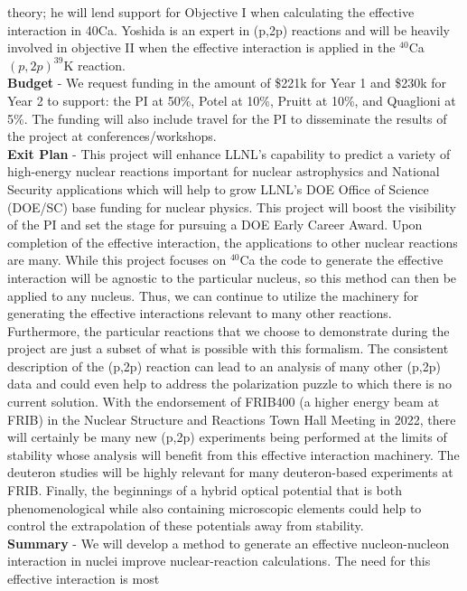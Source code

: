 \documentclass[12pt]{article}
\begin{document}
theory; he will lend support for Objective I when calculating the effective interaction in 40Ca. Yoshida is an expert in (p,2p) reactions and will be heavily involved in objective
II when the effective interaction is applied in the $^{40}$Ca$(p,2p)^{39}$K reaction.
\\
\textbf{Budget}
 - We request funding in the amount of \$221k for Year 1 and \$230k for Year 2 to support: the PI at 50\%, Potel at 10\%, Pruitt at 10\%, and Quaglioni at 5\%. The funding will
 also include travel for the PI to disseminate the results of the project at conferences/workshops.
\\
\textbf{Exit Plan}
 - This project will enhance LLNL's capability to predict a variety of high-energy nuclear reactions important for nuclear astrophysics and National Security applications which will
help to grow LLNL's DOE Office of Science (DOE/SC) base funding for nuclear physics. This project will boost the visibility of the PI and set the stage for pursuing a DOE Early
Career Award. Upon completion of the effective interaction, the applications to other nuclear reactions are many. While this project focuses on $^{40}$Ca the code to generate the
effective interaction will be agnostic to the particular nucleus, so this method can then be applied to any nucleus. Thus, we can continue to utilize the machinery for generating
the effective interactions relevant to many other reactions. Furthermore, the particular reactions that we choose to demonstrate during the project are just a subset of what is
possible with this formalism. The consistent description of the (p,2p) reaction can lead to an analysis of many other (p,2p) data and could even help to address the polarization
puzzle to which there is no current solution.  With the endorsement of FRIB400 (a higher energy beam at FRIB) in the Nuclear Structure and Reactions Town Hall Meeting in 2022,
there will certainly be many new (p,2p) experiments being performed at the limits of stability whose analysis will benefit from this effective interaction machinery. The deuteron
studies will be highly relevant for many deuteron-based experiments at FRIB. Finally, the beginnings of a hybrid optical potential that is both phenomenological while also
containing microscopic elements could help to control the extrapolation of these potentials away from stability. 
\\
\textbf{Summary}
 - We will develop a method to generate an effective nucleon-nucleon interaction in nuclei improve nuclear-reaction calculations. The need for this effective interaction is most
\end{document}
